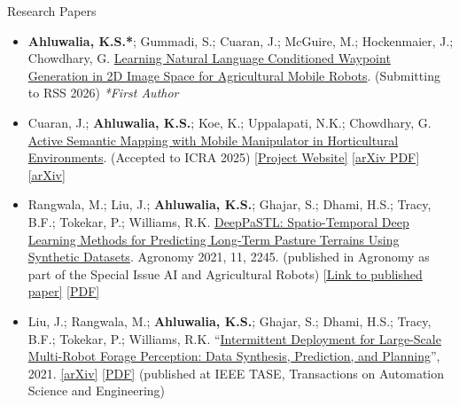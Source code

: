 \documentclass{resume} %
\begin{document}
\begin{rSection}{Research Papers}
    \begin{itemize}[noitemsep]
        \item \textbf{Ahluwalia, K.S.*}; Gummadi, S.; Cuaran, J.; McGuire, M.; Hockenmaier, J.; Chowdhary, G. \ul{Learning Natural Language Conditioned Waypoint Generation in 2D Image Space for Agricultural Mobile Robots}. (Submitting to RSS 2026) \textit{*First Author}
        \item Cuaran, J.; \textbf{Ahluwalia, K.S.}; Koe, K.; Uppalapati, N.K.; Chowdhary, G. \ul{Active Semantic Mapping with Mobile Manipulator in Horticultural Environments}. (Accepted to ICRA 2025) 
        \href{https://kendallkoe.com/ICRA_UIE/ } {[Project Website]} 
        \href{https://arxiv.org/pdf/2501.19395 } {[arXiv PDF]} \href{https://arxiv.org/abs/2501.19395 } {[arXiv]} 
        \item Rangwala, M.; Liu, J.; \textbf{Ahluwalia, K.S.}; Ghajar, S.; Dhami, H.S.; Tracy, B.F.; Tokekar, P.; Williams, R.K. \ul{DeepPaSTL: Spatio-Temporal Deep Learning Methods for Predicting Long-Term Pasture Terrains Using Synthetic Datasets}. Agronomy 2021, 11, 2245. (published in Agronomy as part of the Special Issue AI and Agricultural Robots) \href{https://doi.org/10.3390/agronomy11112245} {[Link to published paper]} \href{https://drive.google.com/file/d/1chm-GREu_F6giMr692lVPtRuJYVM_UcB/view?usp=sharing}{[PDF]}
        \item Liu, J.; Rangwala, M.; \textbf{Ahluwalia, K.S.}; Ghajar, S.; Dhami, H.S.; Tracy, B.F.; Tokekar, P.; Williams, R.K.  ``\ul{Intermittent Deployment for Large-Scale Multi-Robot Forage Perception: Data Synthesis, Prediction, and Planning}'', 2021. \href{https://arxiv.org/abs/2112.09203}{[arXiv]} \href{https://arxiv.org/pdf/2112.09203.pdf}{[PDF]}
        (published at IEEE TASE, Transactions on Automation Science and Engineering)
    \end{itemize}
\end{rSection}
\end{document}
